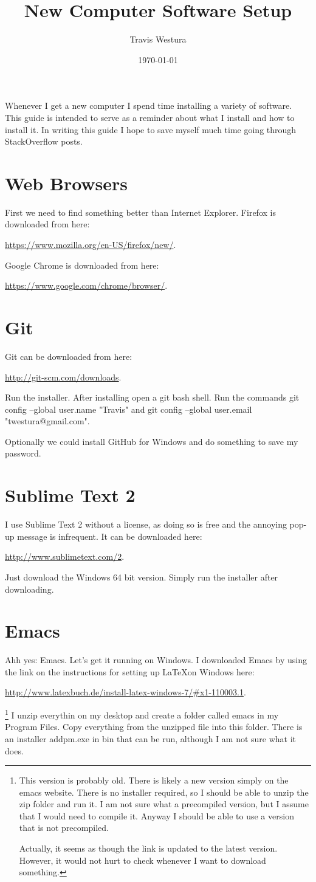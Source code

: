 \documentclass{article}
\author{Travis Westura}
\title{New Computer Software Setup}
\date{\today}
\newcommand{\web}[2]{
	\begin{center}
		\url{#1}{#2}
	\end{center}
}
\begin{document}
\maketitle

Whenever I get a new computer I spend time installing a variety of software.
This guide is intended to serve as a reminder about what I install and how to install it.
In writing this guide I hope to save myself much time going through StackOverflow posts.

\section{Web Browsers}

First we need to find something better than Internet Explorer.
Firefox is downloaded from here: 
	\web{https://www.mozilla.org/en-US/firefox/new/}{.}
Google Chrome is downloaded from here:
	\web{https://www.google.com/chrome/browser/}.

\section{Git}
Git can be downloaded from here:
	\web{http://git-scm.com/downloads}.
Run the installer.
After installing open a git bash shell.
Run the commands git config --global user.name "Travis" and git config --global user.email "twestura@gmail.com".

Optionally we could install GitHub for Windows and do something to save my password.

\section{Sublime Text 2}
I use Sublime Text 2 without a license, as doing so is free and the annoying pop-up message is infrequent.
It can be downloaded here:
	\web{http://www.sublimetext.com/2}.
Just download the Windows 64 bit version.
Simply run the installer after downloading.

\section{Emacs}
Ahh yes: Emacs.
Let's get it running on Windows.
I downloaded Emacs by using the link on the instructions for setting up \LaTeX on Windows here:
	 \web{http://www.latexbuch.de/install-latex-windows-7/\#x1-110003.1}.
\footnote{
	This version is probably old.
	There is likely a new version simply on the emacs website.
	There is no installer required, so I should be able to unzip the zip folder and run it.
	I am not sure what a precompiled version, but I assume that I would need to compile it.
	Anyway I should be able to use a version that is not precompiled.

	Actually, it seems as though the link is updated to the latest version.
	However, it would not hurt to check whenever I want to download something.
}
I unzip everythin on my desktop and create a folder called emacs in my Program Files.
Copy everything from the unzipped file into this folder.
There is an installer addpm.exe in bin that can be run, although I am not sure what it does.
\end{document}
